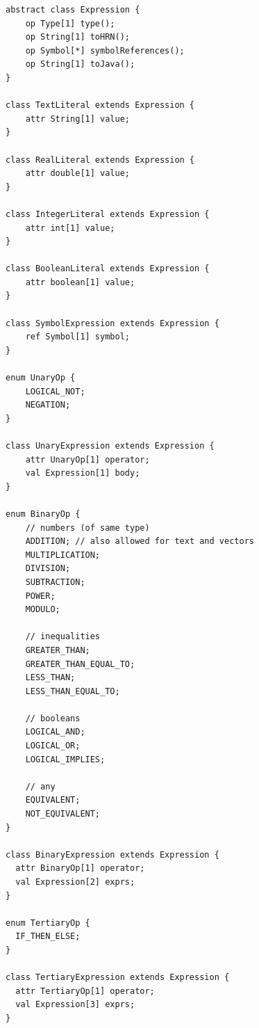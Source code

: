 \documentclass[11pt,fleqn]{article}
\begin{document}
\begin{lstlisting}[caption={Expression Language},label={lst:expression-language}]
  abstract class Expression {
	op Type[1] type();
	op String[1] toHRN();
	op Symbol[*] symbolReferences();
	op String[1] toJava();
}

class TextLiteral extends Expression {
	attr String[1] value;
}

class RealLiteral extends Expression {
	attr double[1] value;
}

class IntegerLiteral extends Expression {
	attr int[1] value;
}

class BooleanLiteral extends Expression {
	attr boolean[1] value;
}

class SymbolExpression extends Expression {
    ref Symbol[1] symbol;
}

enum UnaryOp {
	LOGICAL_NOT;
	NEGATION;
}

class UnaryExpression extends Expression {
	attr UnaryOp[1] operator;
	val Expression[1] body;
}

enum BinaryOp {
	// numbers (of same type)
	ADDITION; // also allowed for text and vectors
	MULTIPLICATION;
	DIVISION;
	SUBTRACTION;
	POWER;
	MODULO;

	// inequalities
	GREATER_THAN;
	GREATER_THAN_EQUAL_TO;
	LESS_THAN;
	LESS_THAN_EQUAL_TO;
	
	// booleans
	LOGICAL_AND;
	LOGICAL_OR;
	LOGICAL_IMPLIES;
	
	// any
	EQUIVALENT;
	NOT_EQUIVALENT;
}

class BinaryExpression extends Expression {
  attr BinaryOp[1] operator;
  val Expression[2] exprs;
}

enum TertiaryOp {
  IF_THEN_ELSE;
}

class TertiaryExpression extends Expression {
  attr TertiaryOp[1] operator;
  val Expression[3] exprs;
}
\end{lstlisting}
\end{document}
